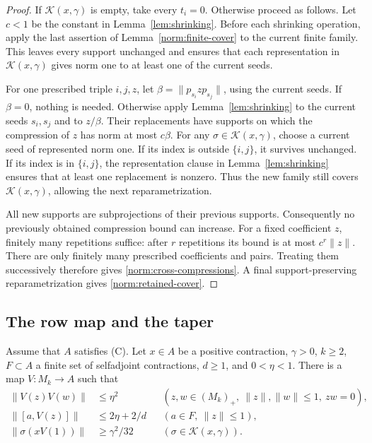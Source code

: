 \begin{proof}
If \(\mathcal K(x,\gamma)\) is empty, take every \(t_i=0\).
Otherwise proceed as follows.
Let \(c<1\) be the constant in Lemma~\ref{lem:shrinking}.
Before each shrinking operation, apply the last assertion of
Lemma~\ref{norm:finite-cover} to the current finite family.
This leaves every support unchanged and ensures that each
representation in \(\mathcal K(x,\gamma)\) gives norm one to at
least one of the current seeds.

For one prescribed triple \(i,j,z\), let
\(\beta=\|p_{s_i}zp_{s_j}\|\), using the current seeds.  If
\(\beta=0\), nothing is needed.  Otherwise apply
Lemma~\ref{lem:shrinking} to the current seeds \(s_i,s_j\) and to
\(z/\beta\).  Their replacements have supports on which the
compression of \(z\) has norm at most \(c\beta\).
For any \(\sigma\in\mathcal K(x,\gamma)\), choose a current seed of
represented norm one.  If its index is outside \(\{i,j\}\), it
survives unchanged.  If its index is in \(\{i,j\}\), the
representation clause in Lemma~\ref{lem:shrinking} ensures that
at least one replacement is nonzero.  Thus the new family still
covers \(\mathcal K(x,\gamma)\), allowing the next
reparametrization.

All new supports are subprojections of their previous supports.
Consequently no previously obtained compression bound can increase.
For a fixed coefficient \(z\), finitely many repetitions suffice:
after \(r\) repetitions its bound is at most \(c^r\|z\|\).
There are only finitely many prescribed coefficients and pairs.
Treating them successively therefore gives
\eqref{norm:cross-compressions}.  A final support-preserving
reparametrization gives \eqref{norm:retained-cover}.
\end{proof}

\subsection{The row map and the taper}

\begin{lemma}\label{norm:finite-stage}
Assume that $A$ satisfies \textup{(C)}. Let \(x\in A\) be a positive
contraction, \(\gamma>0\), \(k\ge2\),
\(F\subset A\) a finite set of selfadjoint contractions,
\(d\ge1\), and \(0<\eta<1\).
There is a \cpc map \(V:M_k\to A\) such that
\begin{align}
 \|V(z)V(w)\|&\le\eta^2
   &&(z,w\in(M_k)_+,\ \|z\|,\|w\|\le1,\ zw=0),            \label{norm:order-zero-error}\\
 \|[a,V(z)]\|&\le2\eta+2/d
   &&(a\in F,\ \|z\|\le1),                               \label{norm:central-error}\\
 \|\sigma(xV(1))\|&\ge\gamma^2/32
   &&(\sigma\in\mathcal K(x,\gamma)).                    \label{norm:finite-visibility}
\end{align}
\end{lemma}

